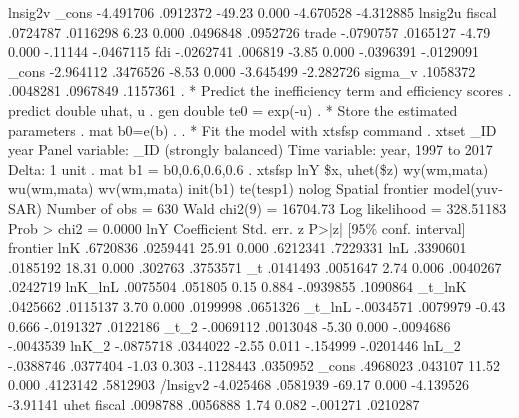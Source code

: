 lnsig2v      {\VBAR}
       _cons {\VBAR}  -4.491706   .0912372   -49.23   0.000    -4.670528   -4.312885
lnsig2u      {\VBAR}
      fiscal {\VBAR}   .0724787   .0116298     6.23   0.000     .0496848    .0952726
       trade {\VBAR}  -.0790757   .0165127    -4.79   0.000      -.11144   -.0467115
         fdi {\VBAR}  -.0262741    .006819    -3.85   0.000    -.0396391   -.0129091
       _cons {\VBAR}  -2.964112   .3476526    -8.53   0.000    -3.645499   -2.282726
     sigma_v {\VBAR}   .1058372   .0048281                      .0967849    .1157361
{\smallskip}
. * Predict the inefficiency term and efficiency scores
. predict double uhat, u
{\smallskip}
. gen double te0 = exp(-u) 
{\smallskip}
. * Store the estimated parameters
. mat b0=e(b)
{\smallskip}
. 
. * Fit the model with xtsfsp command
. xtset _ID year
{\smallskip}
Panel variable: _ID (strongly balanced)
 Time variable: year, 1997 to 2017
         Delta: 1 unit
{\smallskip}
. mat b1 = b0,0.6,0.6,0.6
{\smallskip}
. xtsfsp lnY \$x, uhet(\$z) wy(wm,mata) wu(wm,mata) wv(wm,mata) init(b1) te(tesp1) nolog 
{\smallskip}
Spatial frontier model(yuv-SAR)                       Number of obs =      630
                                                      Wald chi2(9)  = 16704.73
Log likelihood = 328.51183                            Prob > chi2   =   0.0000
{\smallskip}
         lnY {\VBAR} Coefficient  Std. err.      z    P>|z|     [95\% conf. interval]
frontier     {\VBAR}
         lnK {\VBAR}   .6720836   .0259441    25.91   0.000     .6212341    .7229331
         lnL {\VBAR}   .3390601   .0185192    18.31   0.000      .302763    .3753571
          _t {\VBAR}   .0141493   .0051647     2.74   0.006     .0040267    .0242719
     lnK_lnL {\VBAR}   .0075504    .051805     0.15   0.884    -.0939855    .1090864
      _t_lnK {\VBAR}   .0425662   .0115137     3.70   0.000     .0199998    .0651326
      _t_lnL {\VBAR}  -.0034571   .0079979    -0.43   0.666    -.0191327    .0122186
        _t_2 {\VBAR}  -.0069112   .0013048    -5.30   0.000    -.0094686   -.0043539
       lnK_2 {\VBAR}  -.0875718   .0344022    -2.55   0.011     -.154999   -.0201446
       lnL_2 {\VBAR}  -.0388746   .0377404    -1.03   0.303    -.1128443    .0350952
       _cons {\VBAR}   .4968023    .043107    11.52   0.000     .4123142    .5812903
    /lnsigv2 {\VBAR}  -4.025468   .0581939   -69.17   0.000    -4.139526    -3.91141
uhet         {\VBAR}
      fiscal {\VBAR}   .0098788   .0056888     1.74   0.082     -.001271    .0210287
